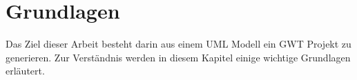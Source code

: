 \chapter{Grundlagen}
\label{Grundlagen}
Das Ziel dieser Arbeit besteht darin aus einem UML Modell ein GWT Projekt zu
generieren. Zur Verständnis werden in diesem Kapitel einige wichtige
Grundlagen erläutert.





